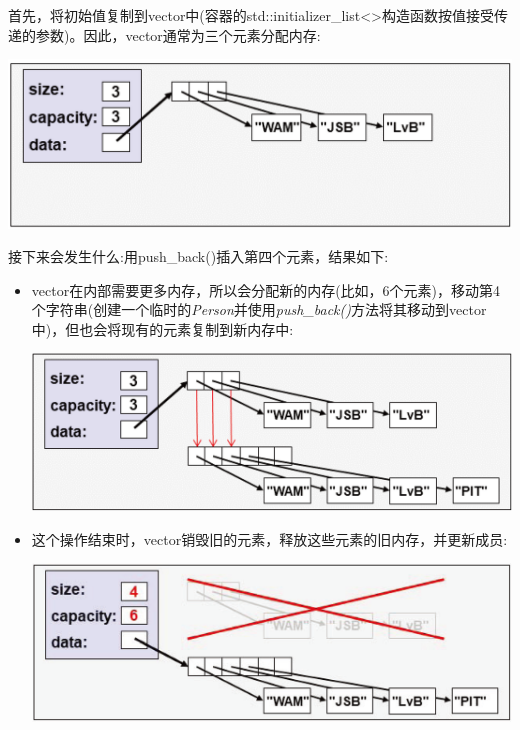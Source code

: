 首先，将初始值复制到vector中(容器的std::initializer\_list<>构造函数按值接受传递的参数)。因此，vector通常为三个元素分配内存:\par

\begin{center}
	\includegraphics[width=1.0\textwidth]{content/1/chapter7/images/1}
\end{center}

接下来会发生什么:用push\_back()插入第四个元素，结果如下:\par

\begin{itemize}
	\item vector在内部需要更多内存，所以会分配新的内存(比如，6个元素)，移动第4个字符串(创建一个临时的\textit{Person}并使用\textit{push\_back()}方法将其移动到vector中)，但也会将现有的元素复制到新内存中:\par
	\begin{center}
		\includegraphics[width=1.0\textwidth]{content/1/chapter7/images/2}
	\end{center}
	\item 这个操作结束时，vector销毁旧的元素，释放这些元素的旧内存，并更新成员:\par
	\begin{center}
		\includegraphics[width=1.0\textwidth]{content/1/chapter7/images/3}
	\end{center}
\end{itemize}

